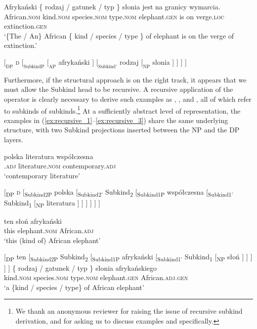 \documentclass[output=paper]{langscibook}
\begin{document}
\ea \gll
Afrykański \{ rodzaj / gatunek / typ \} słonia jest na granicy wymarcia.\\
African.\textsc{nom} { } kind.\textsc{nom} { } species.\textsc{nom} { } type.\textsc{nom} { } elephant.\textsc{gen} is on verge.\textsc{loc} extinction.\textsc{gen}\\
\glt `\{The / An\} African \{ kind / species / type \} of elephant is on the verge of extinction.'
\label{ex:kind_head}
\z

\ea $[_\text{DP}$ \textsc{d} $[_\text{SubkindP}$ $[_\text{AP}$ afrykański $]$ $[_\text{Subkind'}$ rodzaj $[_\text{NP}$ slonia ] ] ] ]
\label{ex:structure_2}
\z

\noindent
Furthermore, if the structural approach is on the right track, it appears that we must allow the Subkind head to be recursive. A recursive application of the  operator is clearly necessary to derive such examples as , , and , all of which refer to subkinds of subkinds.\footnote{We thank an anonymous reviewer for raising the issue of recursive subkind derivation, and for asking us to discuss examples  and  specifically.} At a sufficiently abstract level of representation, the examples in (\ref{ex:recursive_1}--\ref{ex:recursive_3}) share the same underlying structure, with two Subkind projections inserted between the NP and the DP layers.\largerpage

\ea \label{ex:recursive_1}
\ea \gll
polska literatura współczesna\\
.\textsc{adj} literature.\textsc{nom} contemporary.\textsc{adj}\\
\glt `contemporary  literature'

\ex
{}[\textsubscript{DP} \textsc{d} [\textsubscript{Subkind2P} polska [\textsubscript{Subkind2'} Subkind\textsubscript{2} [\textsubscript{Subkind1P} współczesna [\textsubscript{Subkind1'} Subkind\textsubscript{1} [\textsubscript{NP} literatura ] ] ] ] ] ]
\z \z

\ea \label{ex:recursive_2}
\ea \gll
ten słoń afrykański\\
this elephant.\textsc{nom} African.\textsc{adj}\\
\glt `this (kind of) African elephant'

\ex
{}[\textsubscript{DP} ten [\textsubscript{Subkind2P} Subkind\textsubscript{2} [\textsubscript{Subkind1P} afrykański [\textsubscript{Subkind1'} Subkind\textsubscript{1} [\textsubscript{NP} słoń ] ] ] ] ]
\z \ex \label{ex:recursive_3}
\ea \gll
\{ rodzaj / gatunek / typ \} słonia afrykańskiego\\
{ } kind.\textsc{nom} { } species.\textsc{nom} { } type.\textsc{nom} { } elephant.\textsc{gen} African.\textsc{adj}.\textsc{gen}\\
\glt `a \{kind / species / type\} of African elephant'
\end{document}
